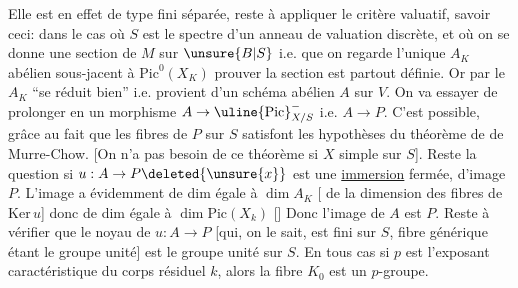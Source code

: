 Elle est en effet de type fini\unsure{;|,} séparée, reste
à appliquer le critère valuatif, savoir
ceci: dans le cas où $S$ est le spectre d'un
anneau de valuation discrète, et où on se
donne une section  de $M$ sur $\unsure{B|S}$ i.e. que
on regarde l'unique $A_K$ abélien
sous-jacent à $\mathrm{Pic}^0(X_K)$\deleted{\unsure{,|$\ast$}}  prouver 
la section est partout définie. Or par le
 $A_K$ ``se réduit bien''
i.e. provient d'un schéma abélien $A$
sur $V$. On va essayer de prolonger
en un  morphisme $A\to\uline{\mathrm{Pic}}^{-}_{X/S}$
i.e. $A\to P$. C'est possible, grâce au
fait que les fibres de $P$ sur $S$ satisfont
les hypothèses du théorème de  
de Murre-Chow. [On n'a pas besoin de
ce théorème si $X$ simple sur $S$].
Reste la question si $u:A\to P\deleted{\unsure{x}}$ est une
\uline{immersion} fermée, d'image $P$. L'image a
 évidemment  de dim égale à $\dim A_K$ 
  [ de la dimension des fibres
de $\mathrm{Ker}\,u$] donc de dim égale à
$\dim\mathrm{Pic}(X_k)$ []
Donc l'image de $A$ est $P$. Reste à vérifier
que le noyau de  $u:A\to P$  [qui, on
le sait, est fini sur $S$, fibre générique étant
le groupe unité] est le groupe unité sur $S$.
En tous cas   si
$p$ est l'exposant caractéristique du corps résiduel
$k$, alors la fibre $K_0$ est un $p$-groupe.


